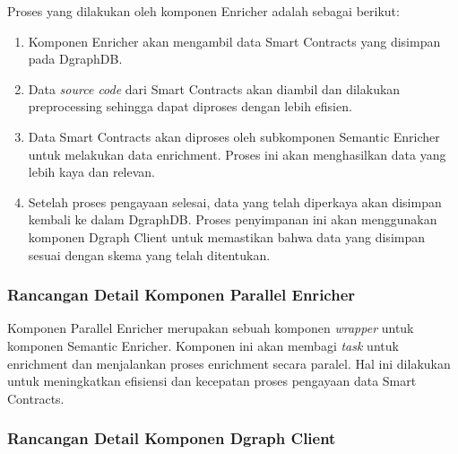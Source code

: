 Proses yang dilakukan oleh komponen Enricher adalah sebagai berikut:
\begin{enumerate}
	\item Komponen Enricher akan mengambil data Smart Contracts yang disimpan pada DgraphDB.
	\item Data \textit{source code} dari Smart Contracts akan diambil dan dilakukan preprocessing sehingga dapat diproses dengan lebih efisien.
	\item Data Smart Contracts akan diproses oleh subkomponen Semantic Enricher untuk melakukan data enrichment. Proses ini akan menghasilkan data yang lebih kaya dan relevan.
	\item Setelah proses pengayaan selesai, data yang telah diperkaya akan disimpan kembali ke dalam DgraphDB. Proses penyimpanan ini akan menggunakan komponen Dgraph Client untuk memastikan bahwa data yang disimpan sesuai dengan skema yang telah ditentukan.
\end{enumerate}

\subsubsection{Rancangan Detail Komponen Parallel Enricher}

Komponen Parallel Enricher merupakan sebuah komponen \textit{wrapper} untuk komponen Semantic Enricher. Komponen ini akan membagi \textit{task} untuk enrichment dan menjalankan proses enrichment secara paralel. Hal ini dilakukan untuk meningkatkan efisiensi dan kecepatan proses pengayaan data Smart Contracts.



\subsubsection{Rancangan Detail Komponen Dgraph Client}

